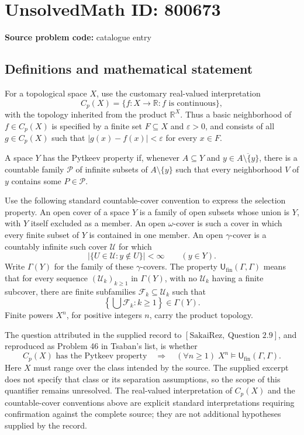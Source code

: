 \documentclass[11pt]{article}
\newcommand{\R}{\mathbb{R}}
\begin{document}
\section*{UnsolvedMath ID: 800673}
\textbf{Source problem code:} catalogue entry
\subsection{Definitions and mathematical statement}
For a topological space \(X\), use the customary real-valued interpretation
\[
C_p(X)=\{f:X\to\R:f\text{ is continuous}\},
\]
with the topology inherited from the product \(\R^X\). Thus a basic neighborhood of \(f\in C_p(X)\) is specified by a finite set \(F\subseteq X\) and \(\varepsilon>0\), and consists of all \(g\in C_p(X)\) such that \(|g(x)-f(x)|<\varepsilon\) for every \(x\in F\).

A space \(Y\) has the Pytkeev property if, whenever \(A\subseteq Y\) and \(y\in\overline{A\setminus\{y\}}\), there is a countable family \(\mathcal P\) of infinite subsets of \(A\setminus\{y\}\) such that every neighborhood \(V\) of \(y\) contains some \(P\in\mathcal P\).

Use the following standard countable-cover convention to express the selection property. An open cover of a space \(Y\) is a family of open subsets whose union is \(Y\), with \(Y\) itself excluded as a member. An open \(\omega\)-cover is such a cover in which every finite subset of \(Y\) is contained in one member. An open \(\gamma\)-cover is a countably infinite such cover \(\mathcal U\) for which
\[
\bigl|\{U\in\mathcal U:y\notin U\}\bigr|<\infty
\qquad(y\in Y).
\]
Write \(\Gamma(Y)\) for the family of these \(\gamma\)-covers. The property \(\mathsf U_{\mathrm{fin}}(\Gamma,\Gamma)\) means that for every sequence \((\mathcal U_k)_{k\geq1}\) in \(\Gamma(Y)\), with no \(\mathcal U_k\) having a finite subcover, there are finite subfamilies \(\mathcal F_k\subseteq\mathcal U_k\) such that
\[
\left\{\bigcup\mathcal F_k:k\geq1\right\}\in\Gamma(Y).
\]
Finite powers \(X^n\), for positive integers \(n\), carry the product topology.

The question attributed in the supplied record to \([\mathrm{SakaiRez},\ \text{Question }2.9]\), and reproduced as Problem 46 in Tsaban's list, is whether
\[
C_p(X)\text{ has the Pytkeev property}
\quad\Longrightarrow\quad
(\forall n\geq1)\;X^n\models\mathsf U_{\mathrm{fin}}(\Gamma,\Gamma).
\]
Here \(X\) must range over the class intended by the source. The supplied excerpt does not specify that class or its separation assumptions, so the scope of this quantifier remains unresolved. The real-valued interpretation of \(C_p(X)\) and the countable-cover conventions above are explicit standard interpretations requiring confirmation against the complete source; they are not additional hypotheses supplied by the record.
\end{document}
